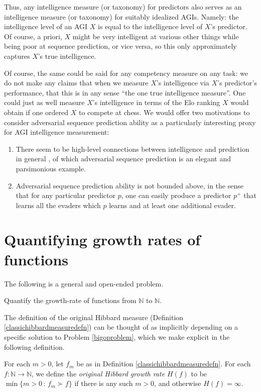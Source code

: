 \documentclass[twoside,11pt]{article}
\begin{document}
Thus, any intelligence measure (or taxonomy) for predictors also serves as an intelligence
measure (or taxonomy) for suitably idealized
AGIs. Namely: the intelligence level of an AGI $X$ is equal to the
intelligence level of $X$'s predictor. Of course, a priori,
$X$ might be very intelligent at various other things while being poor
at sequence prediction, or vice versa, so this only
approximately captures $X$'s true intelligence.

Of course, the same could be said for any competency measure on any task:
we do not make any claims that
when we measure $X$'s intelligence via $X$'s predictor's performance, that this
is in any sense ``the one true intelligence measure''. One could just as well
measure $X$'s intelligence in terms of the Elo ranking $X$ would obtain if one
ordered $X$ to compete at chess.
We would offer two motivations to consider adversarial sequence prediction
ability as a particularly interesting proxy for AGI intelligence measurement:
\begin{enumerate}
    \item There seem to be high-level connections between intelligence and
    prediction in general \citep{hibbard}, of which adversarial sequence prediction
    is an elegant and parsimonious example.
    \item Adversarial sequence prediction ability is not bounded above, in the sense
    that for any particular predictor $p$, one can easily produce a predictor $p^+$
    that learns all the evaders which $p$ learns and at least one additional
    evader.
\end{enumerate}


\section{Quantifying growth rates of functions}
\label{growthratesection}

The following is a general and open-ended problem.

\begin{problem}
\label{bigoproblem}
    Quantify the growth-rate of functions from $\mathbb N$ to $\mathbb N$.
\end{problem}

The definition of the original Hibbard measure
(Definition \ref{classichibbardmeasuredefn})
can be thought of as implicitly depending on a specific solution to Problem
\ref{bigoproblem}, which we make explicit in the following definition.

\begin{definition}
\label{hibbardgrowthratedefn}
    For each $m>0$, let $f_m$ be as in Definition \ref{classichibbardmeasuredefn}.
    For each $f:\mathbb N\to\mathbb N$, we define the \emph{original Hibbard growth rate}
    $H(f)$ to be $\min\{m>0\,:\,f_m\succ f\}$ if there is any such $m>0$, and otherwise
    $H(f)=\infty$.
\end{definition}
\end{document}
